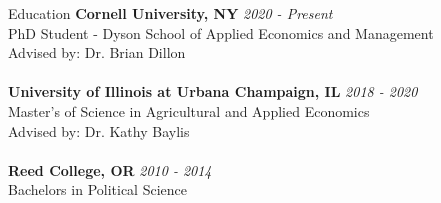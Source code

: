 \documentclass{resume} %
\begin{document}

\begin{rSection}{Education}
{\bf Cornell University, NY} \hfill {\em 2020 - Present} 
\\ PhD Student - Dyson School of Applied Economics and Management \\
Advised by: Dr. Brian Dillon \\
\\{\bf University of Illinois at Urbana Champaign, IL} \hfill {\em 2018 - 2020} 
\\ Master's of Science in Agricultural and Applied Economics\\
Advised by: Dr. Kathy Baylis\\
\\{\bf Reed College, OR} \hfill {\em 2010 - 2014} 
\\ Bachelors in Political Science
\end{rSection}

\end{document}
